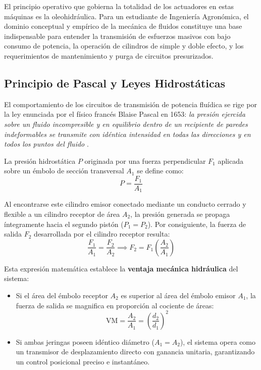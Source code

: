 El principio operativo que gobierna la totalidad de los actuadores en estas máquinas es la oleohidráulica. Para un estudiante de Ingeniería Agronómica, el dominio conceptual y empírico de la mecánica de fluidos constituye una base indispensable para entender la transmisión de esfuerzos masivos con bajo consumo de potencia, la operación de cilindros de simple y doble efecto, y los requerimientos de mantenimiento y purga de circuitos presurizados.

\subsection{Principio de Pascal y Leyes Hidrostáticas}
El comportamiento de los circuitos de transmisión de potencia fluídica se rige por la ley enunciada por el físico francés Blaise Pascal en 1653: \textit{la presión ejercida sobre un fluido incompresible y en equilibrio dentro de un recipiente de paredes indeformables se transmite con idéntica intensidad en todas las direcciones y en todos los puntos del fluido} \parencite{tippens2011,perezmontiel2014}.

La presión hidrostática $P$ originada por una fuerza perpendicular $F_1$ aplicada sobre un émbolo de sección transversal $A_1$ se define como:
\begin{equation}
    P = \frac{F_1}{A_1}
    \label{eq:presion_pascal}
\end{equation}

Al encontrarse este cilindro emisor conectado mediante un conducto cerrado y flexible a un cilindro receptor de área $A_2$, la presión generada se propaga íntegramente hacia el segundo pistón ($P_1 = P_2$). Por consiguiente, la fuerza de salida $F_2$ desarrollada por el cilindro receptor resulta:
\begin{equation}
    \frac{F_1}{A_1} = \frac{F_2}{A_2} \implies F_2 = F_1 \left( \frac{A_2}{A_1} \right)
    \label{eq:fuerza_multiplicada}
\end{equation}

Esta expresión matemática establece la \textbf{ventaja mecánica hidráulica} del sistema:
\begin{itemize}
    \item Si el área del émbolo receptor $A_2$ es superior al área del émbolo emisor $A_1$, la fuerza de salida se magnifica en proporción al cociente de áreas:
    \begin{equation}
        \text{VM} = \frac{A_2}{A_1} = \left(\frac{d_2}{d_1}\right)^2
    \end{equation}
    \item Si ambas jeringas poseen idéntico diámetro ($A_1 = A_2$), el sistema opera como un transmisor de desplazamiento directo con ganancia unitaria, garantizando un control posicional preciso e instantáneo.
\end{itemize}

